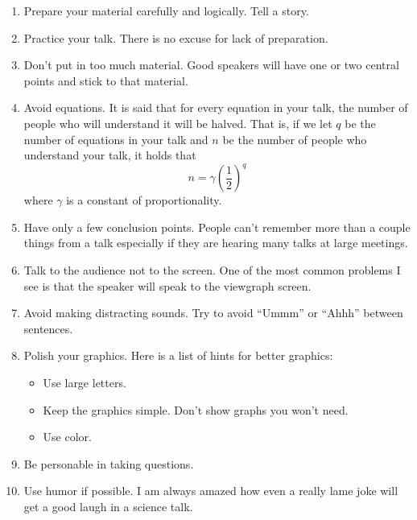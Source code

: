 \documentclass[12pt]{article}
\begin{document}
\begin{enumerate}

\item Prepare your material carefully and logically. Tell a story.

\item Practice your talk. There is no excuse for lack of preparation.

\item Don't put in too much material. Good speakers will have one or two central points and stick to that material.

\item Avoid equations. It is said that for every equation in your talk, the number of people who will understand it will be halved. That is, if we let $q$ be the number of equations in your talk and $n$ be the number of people who understand your talk, it holds that
\begin{equation}
n = \gamma \left( \frac{1}{2} \right)^q
\end{equation}
where $\gamma$ is a constant of proportionality.

\item Have only a few conclusion points. People can't remember more than a couple things from a talk especially if they are hearing many talks at large meetings.

\item Talk to the audience not to the screen. One of the most common problems I see is that the speaker will speak to the viewgraph screen.

\item Avoid making distracting sounds. Try to avoid ``Ummm'' or ``Ahhh'' between sentences.

\item Polish your graphics. Here is a list of hints for better graphics:

\begin{itemize}
\item Use large letters.

\item Keep the graphics simple. Don't show graphs you won't need.

\item Use color.

\end{itemize}

\item Be personable in taking questions.

\item Use humor if possible. I am always amazed how even a really lame joke will get a good laugh in a science talk.

\end{enumerate}
\end{document}
